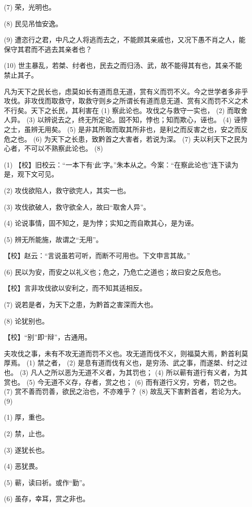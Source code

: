 \documentclass[12pt,UTF8]{ctexbook}
\begin{document}
(7) 荣，光明也。

(8) 民见吊恤安逸。

(9) 遭恣行之君，中凡之人将逃而去之，不能顾其亲戚也，又况下愚不肖之人，能保守其君而不逃去其亲者也？

(10) 世主暴乱，若桀、纣者也，民去之而归汤、武，故不能得其有也，其亲不能禁止其子。

凡为天下之民长也，虑莫如长有道而息无道，赏有义而罚不义。今之世学者多非乎攻伐。非攻伐而取救守，取救守则乡之所谓长有道而息无道、赏有义而罚不义之术不行矣。天下之长民，其利害在 (1) 察此论也。攻伐之与救守一实也， (2) 而取舍人异。 (3) 以辨说去之，终无所定论。固不知，悖也；知而欺心，诬也。 (4) 诬悖之士，虽辨无用矣。 (5) 是非其所取而取其所非也，是利之而反害之也，安之而反危之也。 (6) 为天下之长患，致黔首之大害者，若说为深。 (7) 夫以利天下之民为心者，不可以不熟察此论也。 (8)

(1) 【校】旧校云：“一本下有‘此’字。”朱本从之。今案：“在察此论也”连下读为是，观下文可见。

(2) 攻伐欲陷人，救守欲完人，其实一也。

(3) 攻伐欲破人，救守欲全人，故曰“取舍人异”。

(4) 论说事情，固不知之，是为悖；实知之而自欺其心，是为诬。

(5) 辨无所能施，故谓之“无用”。

【校】赵云：“言说虽若可听，而断不可用也。下文申言其故。”

(6) 民以为安，而安之以礼义也；危之，乃危亡之道也；故曰安之反危也。

【校】言非攻伐欲以安利之，而不知其适相反。

(7) 说若是者，为天下之患，为黔首之害深而大也。

(8) 论犹别也。

【校】“别”即“辩”，古通用。

夫攻伐之事，未有不攻无道而罚不义也。攻无道而伐不义，则福莫大焉，黔首利莫厚焉。 (1) 禁之者， (2) 是息有道而伐有义也，是穷汤、武之事，而遂桀、纣之过也。 (3) 凡人之所以恶为无道不义者，为其罚也； (4) 所以蕲有道行有义者，为其赏也。 (5) 今无道不义存，存者，赏之也； (6) 而有道行义穷，穷者，罚之也。 (7) 赏不善而罚善，欲民之治也，不亦难乎？ (8) 故乱天下害黔首者，若论为大。 (9)

(1) 厚，重也。

(2) 禁，止也。

(3) 遂犹长也。

(4) 恶犹畏。

(5) 蕲，读曰祈。或作“勤”。

(6) 虽存，幸耳，赏之非也。
\end{document}
